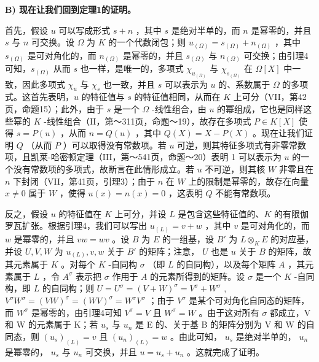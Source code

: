 \textbf{B) 现在让我们回到定理1的证明。}\par

首先，假设 \(u\) 可以写成形式 \(s + n\) ，其中 \(s\) 是绝对半单的，而 \(n\) 是幂零的，并且 \(s\) 与 \(n\) 可交换。设 \(\Omega\) 为 \(K\) 的一个代数闭包；则 \(u_{(\Omega)} = s_{(\Omega)} + n_{(\Omega)}\) ，其中 \(s_{(\Omega)}\) 是可对角化的，而 \(n_{(\Omega)}\) 是幂零的，并且 \(s_{(\Omega)}\) 与 \(n_{(\Omega)}\) 可交换；由引理4可知，\(s_{(\Omega)}\) 从而 \(s\) 也一样，是唯一的，多项式 \(\chi_{u_{(\Omega)}}\) 与 \(\chi_{s_{(\Omega)}}\) 在 \(\Omega[X]\) 中一致，因此多项式 \(\chi_u\) 与 \(\chi_s\) 也一致，并且 \(s\) 可以表示为 \(u\) 的、系数属于 \(\Omega\) 的多项式。这首先表明，\(u\) 的特征值与 \(s\) 的特征值相同，从而在 \(K\) 上可分（VII，第42页，命题15）；此外，由于 \(s\) 是一个 \(\Omega\) -线性组合，由 \(u\) 的幂组成，它也是同样这些幂的 \(K\) -线性组合（II，第～311页，命题～19），故存在多项式 \(P \in K[X]\) 使得 \(s = P(u)\) ，从而 \(n = Q(u)\) ，其中 \(Q(X) = X - P(X)\) 。现在让我们证明 \(Q\) （从而 \(P\) ）可以取得没有常数项。若 \(u\) 可逆，则其特征多项式有非零常数项，且凯莱-哈密顿定理（III，第～541页，命题～20）表明 1 可以表示为 \(u\) 的一个没有常数项的多项式，故断言在此情形成立。若 \(u\) 不可逆，则其核 \(W\) 非零且在 \(n\) 下封闭（VII，第41页，引理3）；由于 \(n\) 在 \(W\) 上的限制是幂零的，故存在向量 \(x \neq 0\) 属于 \(W\) ，使得 \(u(x) = n(x) = 0\) ，这表明 \(Q\) 不能有常数项。

反之，假设 \(u\) 的特征值在 \(K\) 上可分，并设 \(L\) 是包含这些特征值的、\(K\) 的有限伽罗瓦扩张。根据引理4，我们可以写出 \(u_{(L)} = v + w\) ，其中 \(v\) 是可对角化的，而 \(w\) 是幂零的，并且 \(vw = wv\) 。设 \(B\) 为 \(E\) 的一组基，设 \(B'\) 为 \(L \otimes_K E\) 的对应基，并设 \(U, V, W\) 为 \(u_{(L)}, v, w\) 关于 \(B'\) 的矩阵；注意， \(U\) 也是 \(u\) 关于 \(B\) 的矩阵，故其元素属于 \(K\) 。对每个 \(K\) -自同构 \(\sigma\) （即 \(L\) 的自同构），以及每个矩阵 \(A\) ，其元素属于 \(L\) ，令 \(A^\sigma\) 表示把 \(\sigma\) 作用于 \(A\) 的元素所得到的矩阵。设 \(\sigma\) 是一个 \(K\) -自同构，即 \(L\) 的自同构；则 \(U = U^\sigma = (V + W)^\sigma = V^\sigma + W^\sigma\) , \(V^\sigma W^\sigma = (VW)^\sigma = (WV)^\sigma = W^\sigma V^\sigma\) ；由于 \(V^\sigma\) 是某个可对角化自同态的矩阵，而 \(W^\sigma\) 是幂零的，由引理4可知 \(V^\sigma = V\) 且 \(W^\sigma = W\) 。由于这对所有 \(\sigma\) 都成立，V 和 W 的元素属于 K；若 \(u_{s}\) 与 \(u_{n}\) 是 E 的、关于基 B 的矩阵分别为 V 和 W 的自同态，则 \((u_{s})_{(L)} = v\) 且 \((u_{n})_{(L)} = w\) 。由此可知， \(u_{s}\) 是绝对半单的， \(u_{n}\) 是幂零的， \(u_{s}\) 与 \(u_{n}\) 可交换，并且 \(u = u_{s} + u_{n}\) 。这就完成了证明。

